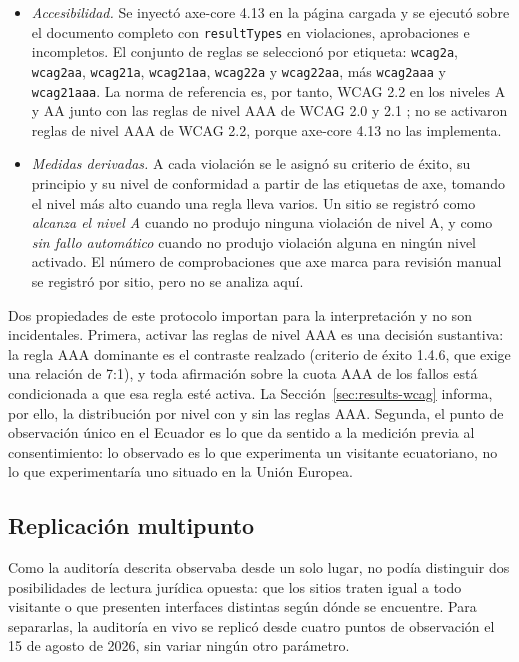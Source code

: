 \documentclass[pdflatex,sn-basic,Numbered]{sn-jnl}
\theoremstyle{thmstyleone}
\theoremstyle{thmstyletwo}
\theoremstyle{thmstylethree}
\begin{document}
\begin{itemize}
	\item \emph{Accesibilidad.} Se inyect\'o axe-core 4.13 \citep{axecore2026} en la p\'agina cargada y se ejecut\'o sobre el documento completo con \verb|resultTypes| en violaciones, aprobaciones e incompletos. El conjunto de reglas se seleccion\'o por etiqueta: \verb|wcag2a|, \verb|wcag2aa|, \verb|wcag21a|, \verb|wcag21aa|, \verb|wcag22a| y \verb|wcag22aa|, m\'as \verb|wcag2aaa| y \verb|wcag21aaa|. La norma de referencia es, por tanto, WCAG 2.2 en los niveles A y AA \citep{wcag22} junto con las reglas de nivel AAA de WCAG 2.0 y 2.1 \citep{wcag21}; no se activaron reglas de nivel AAA de WCAG 2.2, porque axe-core 4.13 no las implementa.
	\item \emph{Medidas derivadas.} A cada violaci\'on se le asign\'o su criterio de \'exito, su principio y su nivel de conformidad a partir de las etiquetas de axe, tomando el nivel m\'as alto cuando una regla lleva varios. Un sitio se registr\'o como \emph{alcanza el nivel A} cuando no produjo ninguna violaci\'on de nivel A, y como \emph{sin fallo autom\'atico} cuando no produjo violaci\'on alguna en ning\'un nivel activado. El n\'umero de comprobaciones que axe marca para revisi\'on manual se registr\'o por sitio, pero no se analiza aqu\'i.
\end{itemize}

Dos propiedades de este protocolo importan para la interpretaci\'on y no son incidentales. Primera, activar las reglas de nivel AAA es una decisi\'on sustantiva: la regla AAA dominante es el contraste realzado (criterio de \'exito 1.4.6, que exige una relaci\'on de 7:1), y toda afirmaci\'on sobre la cuota AAA de los fallos est\'a condicionada a que esa regla est\'e activa. La Secci\'on~\ref{sec:results-wcag} informa, por ello, la distribuci\'on por nivel con y sin las reglas AAA. Segunda, el punto de observaci\'on \'unico en el Ecuador es lo que da sentido a la medici\'on previa al consentimiento: lo observado es lo que experimenta un visitante ecuatoriano, no lo que experimentar\'ia uno situado en la Uni\'on Europea.

\subsection{Replicaci\'on multipunto}\label{sec:methods-vantage}

Como la auditor\'ia descrita observaba desde un solo lugar, no pod\'ia distinguir dos posibilidades de lectura jur\'idica opuesta: que los sitios traten igual a todo visitante o que presenten interfaces distintas seg\'un d\'onde se encuentre. Para separarlas, la auditor\'ia en vivo se replic\'o desde cuatro puntos de observaci\'on el 15 de agosto de 2026, sin variar ning\'un otro par\'ametro.
\end{document}
